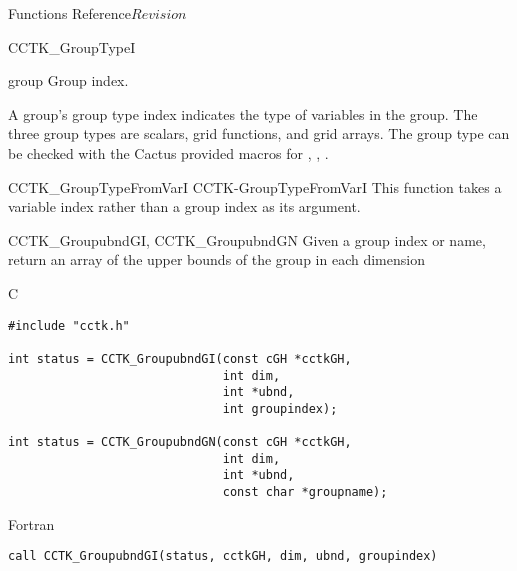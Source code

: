 \begin{cactuspart}{ Functions Reference}{}{$Revision$}
\begin{FunctionDescription}{CCTK\_GroupTypeI}{}
\begin{ParameterSection}
\begin{Parameter}{group}
Group index.
\end{Parameter}
\end{ParameterSection}

\begin{Discussion}
A group's group type index indicates the type of variables in the
group.  The three group types are scalars, grid functions, and grid
arrays. The group type can be checked with the Cactus provided macros
for , , .
\end{Discussion}

\begin{SeeAlsoSection}
\begin{SeeAlso2} {CCTK\_GroupTypeFromVarI} {CCTK-GroupTypeFromVarI}
This function takes a variable index rather than a group index as its argument.
\end{SeeAlso2}
\end{SeeAlsoSection}
\end{FunctionDescription}


\begin{FunctionDescription}{CCTK\_GroupubndGI, CCTK\_GroupubndGN}
\label{CCTK-GroupubndGI}
\label{CCTK-GroupubndGN}
Given a group index or name, return an array of the upper bounds of the group in each dimension

\begin{SynopsisSection}
\begin{Synopsis}{C}
\begin{verbatim}
#include "cctk.h"

int status = CCTK_GroupubndGI(const cGH *cctkGH,
                              int dim,
                              int *ubnd,
                              int groupindex);

int status = CCTK_GroupubndGN(const cGH *cctkGH,
                              int dim,
                              int *ubnd,
                              const char *groupname);
\end{verbatim}
\end{Synopsis}
\begin{Synopsis}{Fortran}
\begin{verbatim}
call CCTK_GroupubndGI(status, cctkGH, dim, ubnd, groupindex)


\end{verbatim}
\end{Synopsis}
\end{SynopsisSection}
\end{FunctionDescription}
\end{cactuspart}
